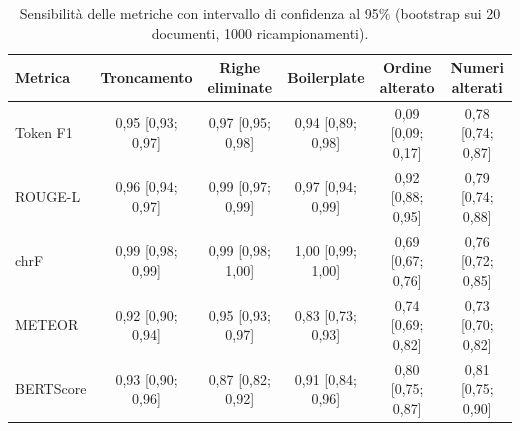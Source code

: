 \begin{table}[htbp]
  \centering
  \small
  \begin{tabular}{lccccc}
    \toprule
    \textbf{Metrica} & \textbf{Troncamento} & \textbf{Righe eliminate} & \textbf{Boilerplate} & \textbf{Ordine alterato} & \textbf{Numeri alterati} \\
    \midrule
    Token F1 & 0,95 [0,93; 0,97] & 0,97 [0,95; 0,98] & 0,94 [0,89; 0,98] & 0,09 [0,09; 0,17] & 0,78 [0,74; 0,87] \\
    ROUGE-L & 0,96 [0,94; 0,97] & 0,99 [0,97; 0,99] & 0,97 [0,94; 0,99] & 0,92 [0,88; 0,95] & 0,79 [0,74; 0,88] \\
    chrF & 0,99 [0,98; 0,99] & 0,99 [0,98; 1,00] & 1,00 [0,99; 1,00] & 0,69 [0,67; 0,76] & 0,76 [0,72; 0,85] \\
    METEOR & 0,92 [0,90; 0,94] & 0,95 [0,93; 0,97] & 0,83 [0,73; 0,93] & 0,74 [0,69; 0,82] & 0,73 [0,70; 0,82] \\
    BERTScore & 0,93 [0,90; 0,96] & 0,87 [0,82; 0,92] & 0,91 [0,84; 0,96] & 0,80 [0,75; 0,87] & 0,81 [0,75; 0,90] \\
    \bottomrule
  \end{tabular}
  \caption{Sensibilità delle metriche con intervallo di confidenza al 95\% (bootstrap sui 20 documenti, 1000 ricampionamenti).}
  \label{tab:sensitivity-ci}
\end{table}

